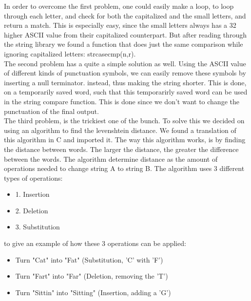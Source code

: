 In order to overcome the first problem, one could easily make a loop, to loop through each letter, and check for both the capitalized and the small letters,
and return a match. This is especially easy, since the small letters always has a 32 higher ASCII value from their capitalized counterpart.
But after reading through the string library we found a function that does just the same comparison while ignoring capitalized letters: strcasecmp(n,r).
\\
The second problem has a quite a simple solution as well. Using the ASCII value of different kinds of punctuation symbols, we can easily remove these symbols by inserting a null terminator. 
instead, thus making the string shorter. This is done, on a temporarily saved word, such that this temporarirly saved word can be used in the string compare function. This is done since we don't want to change the punctuation of the final output.
\\
The third problem, is the trickiest one of the bunch. To solve this we decided on using an algorithm to find the levenshtein distance. 
We found a translation of this algorithm in C and imported it\cite{levenshtein}.
The way this algorithm works, is by finding the distance between words. The larger the distance, the greater the difference between the words.
The algorithm determine distance as the amount of operations needed to change string A to string B. The algorithm uses 3 different types of operations:
\begin{itemize}
  \item 1. Insertion
  \item 2. Deletion
  \item 3. Substitution
\end{itemize}

to give an example of how these 3 operations can be applied:
\begin{itemize}
  \item Turn "Cat" into "Fat"  (Substitution, 'C' with 'F')
  \item Turn "Fart" into "Far"  (Deletion, removing the 'T')
  \item Turn "Sittin" into "Sitting"  (Insertion, adding a 'G')
\end{itemize}

